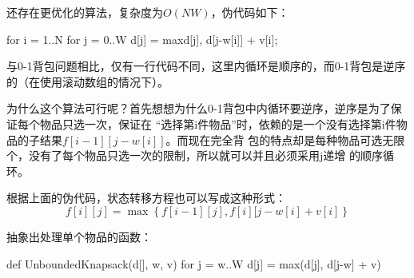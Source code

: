 还存在更优化的算法，复杂度为$O(NW)$，伪代码如下：
\begin{Code}
for i = 1..N
    for j = 0..W
        d[j] = max{d[j], d[j-w[i]] + v[i]};
\end{Code}

与0-1背包问题相比，仅有一行代码不同，这里内循环是顺序的，而0-1背包是逆序的（在使用滚动数组的情况下）。

为什么这个算法可行呢？首先想想为什么0-1背包中内循环要逆序，逆序是为了保证每个物品只选一次，保证在
“选择第i件物品”时，依赖的是一个没有选择第i件物品的子结果$f[i-1][j-w[i]]$。而现在完全背
包的特点却是每种物品可选无限个，没有了每个物品只选一次的限制，所以就可以并且必须采用j递增
的顺序循环。

根据上面的伪代码，状态转移方程也可以写成这种形式：
$$f[i][j]=\max\left\{f[i-1][j], f[i][j-w[i]+v[i]\right\}$$

抽象出处理单个物品的函数：
\begin{Code}
def UnboundedKnapsack(d[], w, v)
    for j = w..W
        d[j] = max(d[j], d[j-w] + v)
\end{Code}

